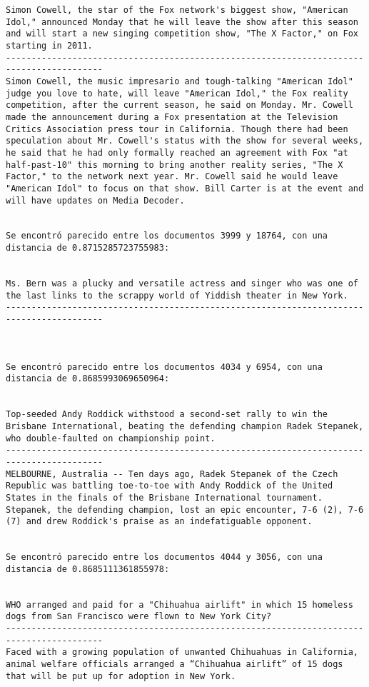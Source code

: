 \documentclass[11pt]{article}
\begin{document}
\begin{Verbatim}[commandchars=\\\{\}]
Simon Cowell, the star of the Fox network's biggest show, "American Idol," announced Monday that he will leave the show after this season and will start a new singing competition show, "The X Factor," on Fox starting in 2011.
-----------------------------------------------------------------------------------------
Simon Cowell, the music impresario and tough-talking "American Idol" judge you love to hate, will leave "American Idol," the Fox reality competition, after the current season, he said on Monday. Mr. Cowell made the announcement during a Fox presentation at the Television Critics Association press tour in California. Though there had been speculation about Mr. Cowell's status with the show for several weeks, he said that he had only formally reached an agreement with Fox "at half-past-10" this morning to bring another reality series, "The X Factor," to the network next year. Mr. Cowell said he would leave "American Idol" to focus on that show. Bill Carter is at the event and will have updates on Media Decoder.


Se encontró parecido entre los documentos 3999 y 18764, con una distancia de 0.8715285723755983:


Ms. Bern was a plucky and versatile actress and singer who was one of the last links to the scrappy world of Yiddish theater in New York.
-----------------------------------------------------------------------------------------



Se encontró parecido entre los documentos 4034 y 6954, con una distancia de 0.8685993069650964:


Top-seeded Andy Roddick withstood a second-set rally to win the Brisbane International, beating the defending champion Radek Stepanek, who double-faulted on championship point.
-----------------------------------------------------------------------------------------
MELBOURNE, Australia -- Ten days ago, Radek Stepanek of the Czech Republic was battling toe-to-toe with Andy Roddick of the United States in the finals of the Brisbane International tournament. Stepanek, the defending champion, lost an epic encounter, 7-6 (2), 7-6 (7) and drew Roddick's praise as an indefatiguable opponent.


Se encontró parecido entre los documentos 4044 y 3056, con una distancia de 0.8685111361855978:


WHO arranged and paid for a "Chihuahua airlift" in which 15 homeless dogs from San Francisco were flown to New York City?
-----------------------------------------------------------------------------------------
Faced with a growing population of unwanted Chihuahuas in California, animal welfare officials arranged a “Chihuahua airlift” of 15 dogs that will be put up for adoption in New York.



\end{Verbatim}
\end{document}

